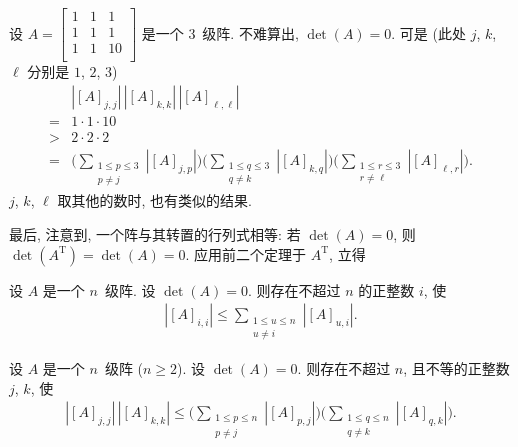 \begin{example}
    设 \(A =
    \begin{bmatrix}
        1 & 1 & 1  \\
        1 & 1 & 1  \\
        1 & 1 & 10 \\
    \end{bmatrix}\)
    是一个 \(3\)~级阵.
    不难算出, \(\det {(A)} = 0\).
    可是
    (此处 \(j\), \(k\), \(\ell\) 分别是 \(1\), \(2\), \(3\))
    \begin{align*}
             &
        |[A]_{j,j}|\,|[A]_{k,k}|\, |[A]_{\ell,\ell}|
        \\
        = {} &
        1 \cdot 1 \cdot 10
        \\
        > {} &
        2 \cdot 2 \cdot 2
        \\
        = {} &
        \Bigg(
        \sum_{\substack{1 \leq p \leq 3 \\
                p \neq j}} {|[A]_{j,p}|}
        \Bigg)
        \Bigg(
        \sum_{\substack{1 \leq q \leq 3 \\
                q \neq k}} {|[A]_{k,q}|}
        \Bigg)
        \Bigg(
        \sum_{\substack{1 \leq r \leq 3 \\
                r \neq \ell}} {|[A]_{\ell,r}|}
        \Bigg).
    \end{align*}
    \(j\), \(k\), \(\ell\) 取其他的数时,
    也有类似的结果.
\end{example}

最后, 注意到, 一个阵与其转置的行列式相等:
若 \(\det {(A)} = 0\),
则 \(\det {(A^{\mathrm{T}})} = \det {(A)} = 0\).
应用前二个定理于 \(A^{\mathrm{T}}\), 立得

\begin{theorem}
    设 \(A\) 是一个 \(n\)~级阵.
    设 \(\det {(A)} = 0\).
    则存在不超过 \(n\) 的正整数 \(i\), 使
    \begin{align*}
        |[A]_{i,i}| \leq
        \sum_{\substack{1 \leq u \leq n \\
            u \neq i}} {|[A]_{u,i}|}.
    \end{align*}
\end{theorem}

\begin{theorem}
    设 \(A\) 是一个 \(n\)~级阵 (\(n \geq 2\)).
    设 \(\det {(A)} = 0\).
    则存在不超过 \(n\), 且不等的正整数 \(j\), \(k\), 使
    \begin{align*}
        |[A]_{j,j}|\,|[A]_{k,k}| \leq
        \Bigg(
        \sum_{\substack{1 \leq p \leq n \\
                p \neq j}} {|[A]_{p,j}|}
        \Bigg)
        \Bigg(
        \sum_{\substack{1 \leq q \leq n \\
                q \neq k}} {|[A]_{q,k}|}
        \Bigg).
    \end{align*}
\end{theorem}

